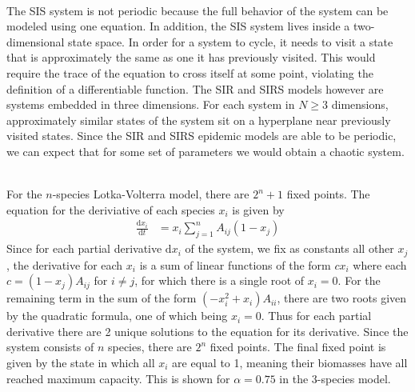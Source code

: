\documentclass[11pt, oneside]{article}   	%
\newcommand{\prob}[2]{
\indent \\
\noindent{\color{green!50!blue}\bf {\large#1.}}
{\normalfont #2}
}
\begin{document}
\prob{5}{
The SIS system is not periodic because the full behavior of the system can be modeled using one equation. In addition, the SIS system lives inside a two-dimensional state space. In order for a system to cycle, it needs to visit a state that is approximately the same as one it has previously visited. This would require the trace of the equation to cross itself at some point, violating the definition of a differentiable function. The SIR and SIRS models however are systems embedded in three dimensions. For each system in $N\geq3$ dimensions, approximately similar states of the system sit on a hyperplane near previously visited states. Since the SIR and SIRS epidemic models are able to be periodic, we can expect that for some set of parameters we would obtain a chaotic system.}
\prob{6}{For the $n$-species Lotka-Volterra model, there are $2^{n}+1$ fixed points. The equation for the deriviative of each species $x_{i}$ is given by
\begin{align*}
    \frac{\mathrm{d}x_{i}}{\mathrm{d}t} &= x_{i}\sum_{j=1}^{n}A_{ij}(1-x_{j})
\end{align*}
Since for each partial derivative $\mathrm{d}x_{i}$ of the system, we fix as constants all other $x_{j}$, the derivative for each $x_{i}$ is a sum of linear functions of the form $cx_{i}$ where each $c=(1-x_{j})A_{ij}$ for $i\neq j$, for which there is a single root of $x_{i}=0$. For the remaining term in the sum of the form $(-x_{i}^{2}+x_{i})A_{ii}$, there are two roots given by the quadratic formula, one of which being $x_{i}=0$. Thus for each partial derivative there are 2 unique solutions to the equation for its derivative. Since the system consists of $n$ species, there are $2^{n}$ fixed points. The final fixed point is given by the state in which all $x_{i}$ are equal to 1, meaning their biomasses have all reached maximum capacity. This is shown for $\alpha=0.75$ in the 3-species model.}
\end{document}
